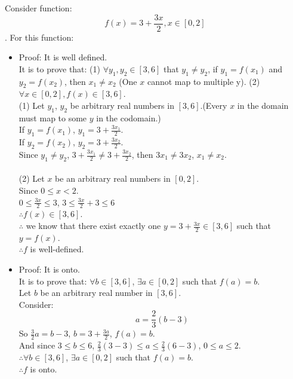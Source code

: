 \documentclass[12pt]{exam}
\begin{document}
\begin{solution}
    Consider function: $$f(x) = 3 + \frac{3x}{2}, x \in [0,2]$$.
    For this function:
    \begin{itemize}
        \item Proof: It is well defined.
        \\It is to prove that: (1) $\forall y_1, y_2 \in [3,6]$ that $y_1 \not = y_2$, if $y_1 = f(x_1)$ and $y_2 = f(x_2)$, then $x_1 \not = x_2$ (One $x$ cannot map to multiple y). (2) $\forall x \in [0,2], f(x) \in [3,6]$.\\
        (1) Let $y_1$, $y_2$ be arbitrary real numbers in $[3,6]$.(Every $x$ in the domain must map to some $y$ in the codomain.)\\
        If $y_1 = f(x_1)$, $y_1 = 3 + \frac{3x_1}{2}$.\\
        If $y_2 = f(x_2)$, $y_2 = 3 + \frac{3x_2}{2}$.\\
        Since $y_1 \not = y_2$, $3 + \frac{3x_1}{2} \not = 3 + \frac{3x_2}{2}$, then $3x_1 \not = 3x_2$, $x_1 \not = x_2$.
        \\\\
        (2) Let $x$ be an arbitrary real numbers in $[0,2]$.\\
        Since $0 \leq x < 2$.\\
        $0 \leq \frac{3x}{2} \leq 3$, $3 \leq \frac{3x}{2} +3 \leq 6$\\
        $\therefore f(x) \in [3,6]$.\\
        $\therefore$ we know that there exist exactly one $y = 3 + \frac{3x}{2} \in [3,6]$ such that $y = f(x)$.\\
        $\therefore f$ is well-defined.

        \item Proof: It is onto.\\
        It is to prove that: $\forall b \in [3,6]$, $\exists a \in [0,2]$ such that $f(a) = b$.\\
        Let $b$ be an arbitrary real number in $[3,6]$.\\
        Consider: $$a = \frac{2}{3} (b-3) $$
        So $\frac{3}{2}a = b - 3$, $b = 3 + \frac{3a}{2}$, $f(a) = b$.\\
        And since $3 \leq b \leq 6$, $\frac{2}{3} (3 - 3) \leq a \leq \frac{2}{3} (6-3)$, $0 \leq a \leq 2$.\\
        $\therefore \forall b \in [3,6]$, $\exists a \in [0,2]$ such that $f(a) = b$.\\
        $\therefore f$ is onto.


\end{itemize}
\end{solution}
\end{document}
